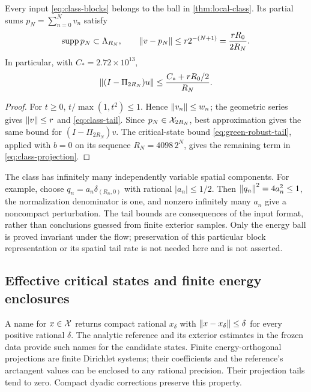 \begin{proposition}\label{prop:class-tail}
Every input \eqref{eq:class-blocks} belongs to the ball in
\cref{thm:local-class}. Its partial sums $p_N=\sum_{n=0}^Nv_n$ satisfy
\begin{equation}\label{eq:class-tail}
 \operatorname{supp} p_N\subset\Lambda_{R_N},\qquad
 \left\lVert v-p_N\right\rVert\le r2^{-(N+1)}=\frac{rR_0}{2R_N}.
\end{equation}
In particular, with $C_*=2.72\times10^{13}$,
\begin{equation}\label{eq:class-projection}
 \left\lVert(I-\Pi_{2R_N})u\right\rVert\le
 \frac{C_*+rR_0/2}{R_N}.
\end{equation}
\end{proposition}
\begin{proof}
For $t\ge0$, $t/\max(1,t^2)\le1$. Hence $\left\lVert v_n\right\rVert\le w_n$;
the geometric series gives $\left\lVert v\right\rVert\le r$ and
\eqref{eq:class-tail}. Since $p_N\in\mathcal X_{2R_N}$, best approximation
gives the same bound for $(I-\Pi_{2R_N})v$. The critical-state bound
\eqref{eq:green-robust-tail}, applied with $b=0$ on its sequence
$R_N=4098\,2^N$, gives the remaining term in
\eqref{eq:class-projection}.
\end{proof}

The class has infinitely many independently variable spatial components.
For example, choose $q_n=a_n\delta_{(R_n,0)}$ with rational
$|a_n|\le1/2$. Then $\left\lVert q_n\right\rVert^2=4a_n^2\le1$, the normalization denominator
is one, and nonzero infinitely many $a_n$ give a
noncompact perturbation. The tail bounds are consequences of the input
format, rather than conclusions guessed from finite exterior samples.
Only the energy ball is proved invariant under the flow; preservation
of this particular block representation or its spatial tail rate is
not needed here and is not asserted.

\subsection{Effective critical states and finite energy enclosures}

A name for $x\in\mathcal X$ returns compact rational $x_\delta$ with
$\left\lVert x-x_\delta\right\rVert\le\delta$ for every positive rational $\delta$.
The analytic reference and its exterior estimates in the frozen data
provide such names for the candidate states. Finite energy-orthogonal
projections are finite Dirichlet systems; their coefficients and the
reference's arctangent values can be enclosed to any rational precision.
Their projection tails tend to zero. Compact dyadic corrections preserve
this property.

